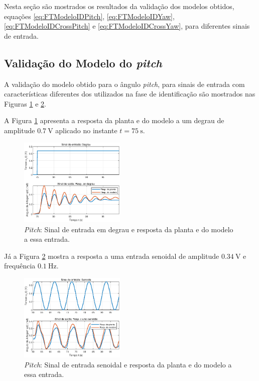 
Nesta seção são mostrados os resultados da validação dos modelos obtidos, equações \eqref{eq:FTModeloIDPitch}, \eqref{eq:FTModeloIDYaw}, \eqref{eq:FTModeloIDCrossPitch} e \eqref{eq:FTModeloIDCrossYaw}, para diferentes sinais de entrada.

\subsection{\textbf{Validação do Modelo do \textit{pitch}}}

A validação do modelo obtido para o ângulo \textit{pitch}, para sinais de entrada com características diferentes dos utilizados na fase de identificação são mostrados nas Figuras \ref{fig:ValidaPitchDegrau} e \ref{fig:ValidaPitchSenoide}.

A Figura \ref{fig:ValidaPitchDegrau} apresenta a resposta da planta e do modelo a um degrau de amplitude $\SI{0.7}{\volt}$ aplicado no instante $t = \SI{75}{\s}$.

\begin{figure}[H]
    \centering
    \includegraphics[width=0.45\textwidth]{figures/Validacao/ValidaPitchDegrau.eps}
    \caption{\textit{Pitch}: Sinal de entrada em degrau e resposta da planta e do modelo a essa entrada.}
    \label{fig:ValidaPitchDegrau}
\end{figure}

Já a Figura \ref{fig:ValidaPitchSenoide} mostra a resposta a uma entrada senoidal de amplitude $\SI{0.34}{\volt}$ e frequência $\SI{0.1}{\Hz}$.

\begin{figure}[H]
    \centering
    \includegraphics[width=0.45\textwidth]{figures/Validacao/ValidaPitchSenoide.eps}
    \caption{\textit{Pitch}: Sinal de entrada senoidal e resposta da planta e do modelo a essa entrada.}
    \label{fig:ValidaPitchSenoide}
\end{figure}

